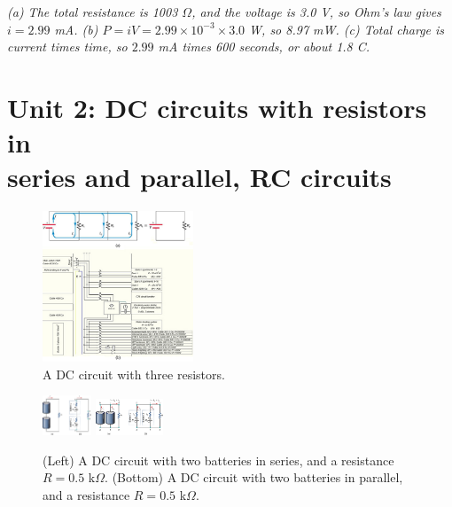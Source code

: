 \documentclass[12pt,twocolumn]{article}
\begin{document}
\begin{enumerate}
\textit{(a) The total resistance is 1003 $\Omega$, and the voltage is 3.0 V, so Ohm's law gives $i = 2.99$ mA. (b) $P = iV = 2.99 \times 10^{-3} \times 3.0$ W, so 8.97 mW. (c) Total charge is current times time, so $2.99$ mA times 600 seconds, or about 1.8 C.}
\end{enumerate}

\section{Unit 2: DC circuits with resistors in \\ series and parallel, RC circuits}

\begin{figure}
\centering
\includegraphics[width=0.4\textwidth,trim=0cm 13.5cm 5.5cm 0cm,clip=true]{parallel.jpeg}
\caption{\label{fig:para} A DC circuit with three resistors.}
\end{figure}
\begin{figure}
\centering
\includegraphics[width=0.13\textwidth,trim=0cm 0.5cm 4cm 0cm,clip=true]{series_batt.jpg}
\includegraphics[width=0.18\textwidth,trim=0cm 0.5cm 5.5cm 0.41cm,clip=true]{parallel_batt.jpg}
\caption{\label{fig:batt} (Left) A DC circuit with two batteries in series, and a resistance $R = 0.5$ k$\Omega$. (Bottom) A DC circuit with two batteries in parallel, and a resistance $R = 0.5$ k$\Omega$.}
\end{figure}
\end{document}
